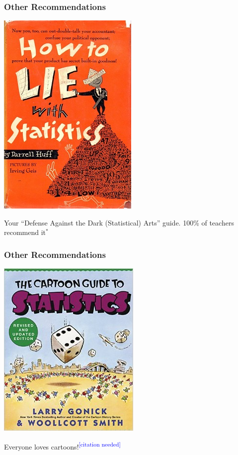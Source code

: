 \documentclass{beamer}
\begin{document}
\begin{frame}
\frametitle{Other Recommendations}
	\begin{center}
		\includegraphics[scale=0.5]{./images/How_to_Lie_with_Statistics.jpg}
	\end{center}
	\begin{center}
	Your ``Defense Against the Dark (Statistical) Arts'' guide. 100\% of teachers recommend it$^*$
	\end{center}
\end{frame}

\begin{frame}
\frametitle{Other Recommendations}
	\begin{center}
		\includegraphics[scale=0.5]{./images/cartoon_stats.jpg}
	\end{center}
	\centering
	Everyone loves cartoons!\textsuperscript{\textcolor{blue}{[citation needed]}}
\end{frame}
\end{document}
